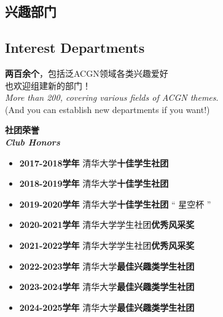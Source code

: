 \begin{flushleft}
\begin{minipage}[t]{0.5\textwidth}
        \section*{\normalsize\textbf{\textcolor{truepurple}{兴趣部门}}}
        \vspace{-1em}
        \subsection*{\normalsize\textbf{\textcolor{thuorange}{Interest Departments}}}
        \vspace{-0.5em}
        \small
        \textbf{两百余个}，包括泛ACGN领域各类兴趣爱好\\也欢迎组建新的部门！\\ \textit{More than 200, covering various fields of ACGN themes}. \\(And you can establish new departments if you want!)
    \end{minipage}
\end{flushleft}

\vfill  %

\vspace{0.5cm}  %
\begin{center}
    \Large\textbf{\textcolor{truepurple}{社团荣誉}}  %
    \\[0ex]  %
    \large\textbf{\textit{\textcolor{thuorange}{Club Honors}}}  %
\end{center}

\vspace{0.5cm}  %
\begin{flushleft}
    \begin{itemize}  %
        \item[] \normalsize\textbf{2017-2018学年} \qquad 清华大学\textbf{十佳学生社团}
        \item[] \normalsize\textbf{2018-2019学年} \qquad 清华大学\textbf{十佳学生社团}
        \item[] \normalsize\textbf{2019-2020学年} \qquad 清华大学\textbf{十佳学生社团} “ 星空杯 ”
        \item[] \normalsize\textbf{2020-2021学年} \qquad 清华大学学生社团\textbf{优秀风采奖}
        \item[] \normalsize\textbf{2021-2022学年} \qquad 清华大学学生社团\textbf{优秀风采奖}
        \item[] \normalsize\textbf{2022-2023学年} \qquad 清华大学\textbf{最佳兴趣类学生社团}
        \item[] \normalsize\textbf{2023-2024学年} \qquad 清华大学\textbf{最佳兴趣类学生社团}
        \item[] \normalsize\textbf{2024-2025学年} \qquad 清华大学\textbf{最佳兴趣类学生社团}
    \end{itemize}
\end{flushleft}

